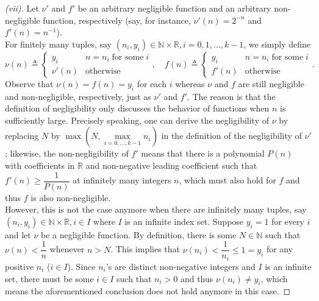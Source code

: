 \begin{proof}[(vii)]
    Let $\nu'$ and $f'$ be an arbitrary negligible function and an arbitrary non-negligible function, respectively (say, for instance, $\nu'(n)=2^{-n}$ and $f'(n)=n^{-1}$).\\
    For finitely many tuples, say $(n_i, y_i)\in\mathbb{N}\times\mathbb{R}, i=0,1,\ldots,k-1$, we simply define
    \[
    \nu(n) \triangleq \begin{cases}
        y_i & n=n_i \; \text{for some} \; i\\
        \nu'(n) & \text{otherwise}
    \end{cases}, \quad
    f(n) \triangleq \begin{cases}
        y_i & n=n_i \; \text{for some} \; i\\
        f'(n) & \text{otherwise}
    \end{cases}.
    \]
    Observe that $\nu(n)=f(n)=y_i$ for each $i$ whereas $\nu$ and $f$ are still negligible and non-negligible, respectively, just as $\nu'$ and $f'$. The reason is that the definition of negligibility only discusses the behavior of functions when $n$ is sufficiently large. Precisely speaking, one can derive the negligibility of $\nu$ by replacing $N$ by $\max(N, \max\limits_{i=0,\ldots,k-1} n_i)$ in the definition of the negligibility of $\nu'$; likewise, the non-negligibility of $f'$ means that there is a polynomial $P(n)$ with coefficients in $\mathbb{R}$ and non-negative leading coefficient such that $f'(n)\ge \dfrac{1}{P(n)}$ at infinitely many integers $n$, which must also hold for $f$ and thus $f$ is also non-negligible.\\
    However, this is not the case anymore when there are infinitely many tuples, say $(n_i, y_i)\in\mathbb{N}\times\mathbb{R}, i\in I$ where $I$ is an infinite index set. Suppose $y_i=1$ for every $i$ and let $\nu$ be a negligible function. By definition, there is some $N\in \mathbb{N}$ such that $\nu(n)\lt \dfrac{1}{n}$ whenever $n\gt N$. This implies that $\nu(n_i)\lt \dfrac{1}{n_i}\le 1=y_i$ for any positive $n_i$ ($i\in I$). Since $n_i$'s are distinct non-negative integers and $I$ is an infinite set, there must be some $i\in I$ such that $n_i\gt 0$ and thus $\nu(n_i)\neq y_i$, which means the aforementioned conclusion does not hold anymore in this case.
\end{proof}


